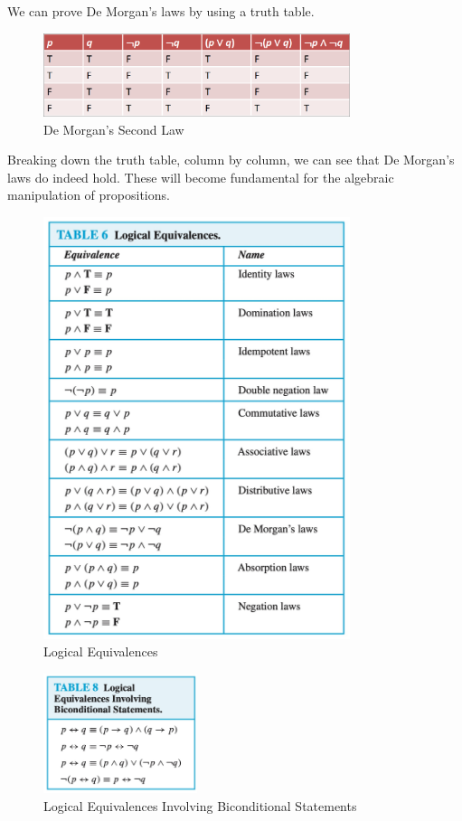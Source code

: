 \documentclass[12pt]{article}
\begin{document}
We can prove De Morgan's laws by using a truth table.

\begin{figure}[H]
    \centering
    \includegraphics[width=0.8\textwidth]{"./de_morgans_second_law.png"}
    \caption{De Morgan's Second Law}
\end{figure}

Breaking down the truth table, column by column, we can see that De Morgan's
laws do indeed hold. These will become fundamental for the algebraic
manipulation of propositions.

\begin{figure}[H]
    \centering
    \includegraphics[width=0.8\textwidth]{"./Logical Equivalences.jpg"}
    \caption{Logical Equivalences}
\end{figure}

\begin{figure}[H]
    \centering
    \includegraphics[width=0.4\textwidth]{"./Logical Equivalences Involving Biconditional Statements.jpg"}
    \caption{Logical Equivalences Involving Biconditional Statements}
\end{figure}
\end{document}
